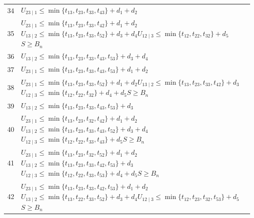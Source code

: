 \documentclass[a4paper,11pt]{amsart}
\numberwithin{equation}{section}
\theoremstyle{definition}
\theoremstyle{remark}
\begin{document}
{\begin{longtable}{@{}r>{\raggedright\arraybackslash}p{12.9cm}@{}}
34 & \(U_{23\mid 1}\leq \min\{t_{13},t_{23},t_{33},t_{43}\}+d_{1}+d_{2}\)\\[3pt]
35 & \(U_{23\mid 1}\leq \min\{t_{13},t_{23},t_{33},t_{42}\}+d_{1}+d_{2}\)\newline \(U_{13\mid 2}\leq \min\{t_{13},t_{23},t_{33},t_{52}\}+d_{3}+d_{4}\)\newline \(U_{12\mid 3}\leq \min\{t_{12},t_{22},t_{32}\}+d_{5}\)\newline \(S\geq B_n\)\\[3pt]
36 & \(U_{13\mid 2}\leq \min\{t_{13},t_{23},t_{33},t_{43},t_{53}\}+d_{3}+d_{4}\)\\[3pt]
37 & \(U_{23\mid 1}\leq \min\{t_{13},t_{23},t_{33},t_{43},t_{53}\}+d_{1}+d_{2}\)\\[3pt]
38 & \(U_{23\mid 1}\leq \min\{t_{13},t_{23},t_{33},t_{52}\}+d_{1}+d_{2}\)\newline \(U_{13\mid 2}\leq \min\{t_{13},t_{23},t_{33},t_{42}\}+d_{3}\)\newline \(U_{12\mid 3}\leq \min\{t_{12},t_{22},t_{32}\}+d_{4}+d_{5}\)\newline \(S\geq B_n\)\\[3pt]
39 & \(U_{13\mid 2}\leq \min\{t_{13},t_{23},t_{33},t_{43},t_{53}\}+d_{3}\)\\[3pt]
40 & \(U_{23\mid 1}\leq \min\{t_{13},t_{23},t_{32},t_{42}\}+d_{1}+d_{2}\)\newline \(U_{13\mid 2}\leq \min\{t_{13},t_{23},t_{33},t_{43},t_{52}\}+d_{3}+d_{4}\)\newline \(U_{12\mid 3}\leq \min\{t_{12},t_{22},t_{33},t_{43}\}+d_{5}\)\newline \(S\geq B_n\)\\[3pt]
41 & \(U_{23\mid 1}\leq \min\{t_{13},t_{23},t_{32},t_{52}\}+d_{1}+d_{2}\)\newline \(U_{13\mid 2}\leq \min\{t_{13},t_{23},t_{33},t_{42},t_{53}\}+d_{3}\)\newline \(U_{12\mid 3}\leq \min\{t_{12},t_{22},t_{33},t_{53}\}+d_{4}+d_{5}\)\newline \(S\geq B_n\)\\[3pt]
42 & \(U_{23\mid 1}\leq \min\{t_{13},t_{23},t_{33},t_{42},t_{53}\}+d_{1}+d_{2}\)\newline \(U_{13\mid 2}\leq \min\{t_{13},t_{22},t_{33},t_{52}\}+d_{3}+d_{4}\)\newline \(U_{12\mid 3}\leq \min\{t_{12},t_{23},t_{32},t_{53}\}+d_{5}\)\newline \(S\geq B_n\)\\[3pt]
\end{longtable}
}
\end{document}
